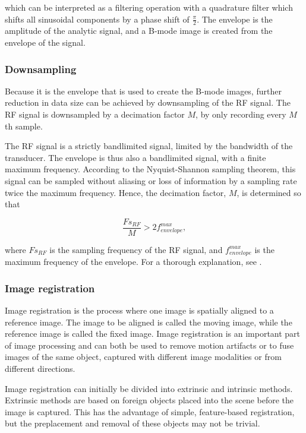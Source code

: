 which can be interpreted as a filtering operation with a quadrature filter which shifts all sinusoidal components by a phase shift of $\frac{\pi}{2}$. The envelope is the amplitude of the analytic signal, and a B-mode image is created from the envelope of the signal. 

\subsubsection{Downsampling}
Because it is the envelope that is used to create the B-mode images, further reduction in data size can be achieved by downsampling of the RF signal. The RF signal is downsampled by a decimation factor $M$, by only recording every $M$th sample. 

The RF signal is a strictly bandlimited signal, limited by the bandwidth of the transducer. The envelope is thus also a bandlimited signal, with a finite maximum frequency. According to the Nyquist-Shannon sampling theorem, this signal can be sampled without aliasing or loss of information by a sampling rate twice the maximum frequency. Hence, the decimation factor, $M$, is determined so that

\begin{equation}
\label{deciamtion}
\frac{Fs_{RF}}{M} > 2f^{max}_{envelope},
\end{equation}

where $Fs_{RF}$ is the sampling frequency of the RF signal, and $f^{max}_{envelope}$ is the maximum frequency of the envelope. For a thorough explanation, see \cite{Crochiere1981}.


\subsubsection{Image registration}
Image registration is the process where one image is spatially aligned to a reference image. The image to be aligned is called the moving image, while the reference image is called the fixed image. Image registration  is an important part of image processing and can both be used to remove motion artifacts or to fuse images of the same object, captured with different image modalities or from different directions. 

Image registration can initially be divided into extrinsic and intrinsic methods. Extrinsic methods are based on foreign objects placed into the scene before the image is captured. This has the advantage of simple, feature-based registration, but the preplacement and removal of these objects may not be trivial. 

